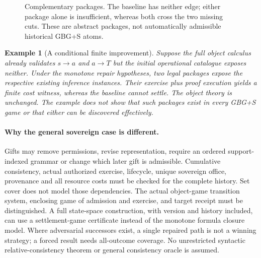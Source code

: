 \documentclass[11pt]{article}
\newtheorem{example}[theorem]{Example}
\theoremstyle{remark}\newtheorem{remark}[theorem]{Remark}
\begin{document}
\begin{figure}[ht]
\centering
{}
\caption{Complementary packages. The baseline has neither edge; either package alone is insufficient, whereas both cross the two missing cuts. These are abstract packages, not automatically admissible historical GBG+S atoms.}
\end{figure}
\begin{example}[A conditional finite improvement]
Suppose the full object calculus already validates $s\to a$ and $a\to T$ but the initial operational catalogue exposes neither. Under the monotone repair hypotheses, two legal packages expose the respective existing inference instances. Their exercise plus proof execution yields a finite cost witness, whereas the baseline cannot settle. The object theory is unchanged. The example does not show that such packages exist in every GBG+S game or that either can be discovered effectively.
\end{example}

\paragraph{Why the general sovereign case is different.} Gifts may remove permissions, revise representation, require an ordered support-indexed grammar or change which later gift is admissible. Cumulative consistency, actual authorized exercise, lifecycle, unique sovereign office, provenance and all resource costs must be checked for the complete history. Set cover does not model those dependencies. The actual object-game transition system, enclosing game of admission and exercise, and target receipt must be distinguished. A full state-space construction, with version and history included, can use a settlement-game certificate instead of the monotone formula closure model. Where adversarial successors exist, a single repaired path is not a winning strategy; a forced result needs all-outcome coverage. No unrestricted syntactic relative-consistency theorem or general consistency oracle is assumed.
\end{document}
